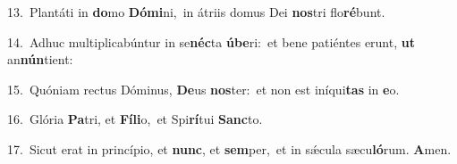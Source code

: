 {\numbfont\textcolor{\numbcolor}{13.}}~Plantáti in \textbf{do}\-mo \textbf{Dó}\-\textbf{mi}ni,~\star in átriis domus Dei \textbf{nos}\-tri flo\-\textbf{ré}\-bunt.\par
{\numbfont\textcolor{\numbcolor}{14.}}~Adhuc multiplicabúntur in se\-\textbf{néc}\-ta \textbf{ú}\-\textbf{be}ri:~\star et bene patiéntes erunt, \textbf{ut} an\-\textbf{nún}\-tient:\par
{\numbfont\textcolor{\numbcolor}{15.}}~Quóniam rectus Dóminus, \textbf{De}\-us \textbf{nos}\-ter:~\star et non est iníqui\textbf{tas} in \textbf{e}\-o.\par
{\numbfont\textcolor{\numbcolor}{16.}}~Glória \textbf{Pa}\-tri, et \textbf{Fí}\-\textbf{li}o,~\star et Spi\-\textbf{rí}\-tui \textbf{Sanc}\-to.\par
{\numbfont\textcolor{\numbcolor}{17.}}~Sicut erat in princípio, et \textbf{nunc}\-, et \textbf{sem}\-per,~\star et in sǽcula sæcu\-\textbf{ló}\-rum. \textbf{A}\-men.\par
